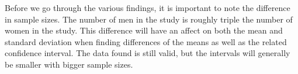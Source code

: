\documentclass[11pt]{article}  %
\begin{document}
\indent Before we go through the various findings, it is important to note the difference in sample sizes. The number of men in the study is roughly triple the number of women in the study. This difference will have an affect on both the mean and standard deviation when finding differences of the means as well as the related confidence interval. The data found is still valid, but the intervals will generally be smaller with bigger sample sizes.
\end{document}
